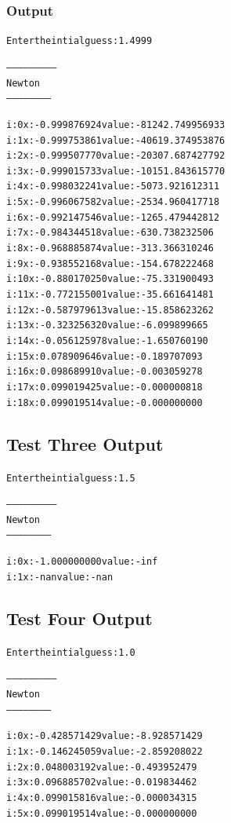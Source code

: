 \documentclass[11pt]{article} %
\begin{document}
\subsubsection*{Output}
\begin{alltt}
Enter the intial guess: 1.4999

--------------------------
 Newton
 -----------------------


i: 0	x: -0.999876924	value: -81242.749956933
i: 1	x: -0.999753861	value: -40619.374953876
i: 2	x: -0.999507770	value: -20307.687427792
i: 3	x: -0.999015733	value: -10151.843615770
i: 4	x: -0.998032241	value: -5073.921612311
i: 5	x: -0.996067582	value: -2534.960417718
i: 6	x: -0.992147546	value: -1265.479442812
i: 7	x: -0.984344518	value: -630.738232506
i: 8	x: -0.968885874	value: -313.366310246
i: 9	x: -0.938552168	value: -154.678222468
i: 10	x: -0.880170250	value: -75.331900493
i: 11	x: -0.772155001	value: -35.661641481
i: 12	x: -0.587979613	value: -15.858623262
i: 13	x: -0.323256320	value: -6.099899665
i: 14	x: -0.056125978	value: -1.650760190
i: 15	x: 0.078909646	value: -0.189707093
i: 16	x: 0.098689910	value: -0.003059278
i: 17	x: 0.099019425	value: -0.000000818
i: 18	x: 0.099019514	value: -0.000000000

\end{alltt}


\subsection*{Test Three Output}
\begin{alltt}

Enter the intial guess: 1.5

--------------------------
 Newton
 -----------------------


i: 0	x: -1.000000000	value: -inf
i: 1	x: -nan	value: -nan

\end{alltt}


\subsection*{Test Four Output}
\begin{alltt}
Enter the intial guess: 1.0

--------------------------
 Newton
 -----------------------


i: 0	x: -0.428571429	value: -8.928571429
i: 1	x: -0.146245059	value: -2.859208022
i: 2	x: 0.048003192	value: -0.493952479
i: 3	x: 0.096885702	value: -0.019834462
i: 4	x: 0.099015816	value: -0.000034315
i: 5	x: 0.099019514	value: -0.000000000

\end{alltt}
\end{document}
